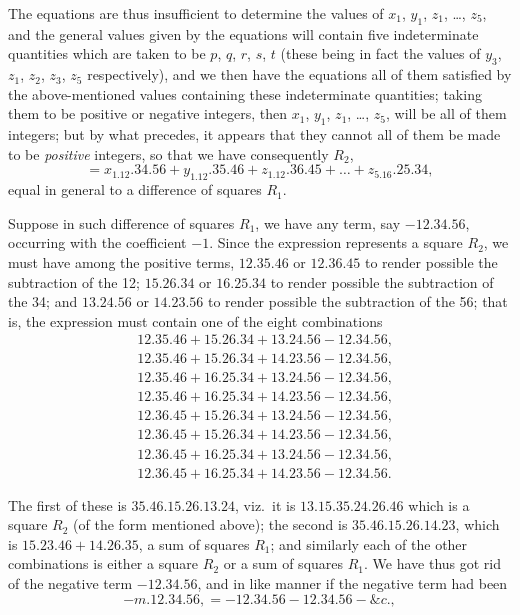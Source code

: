 \documentclass[11pt,a4paper]{book}
\begin{document}
The equations are thus insufficient to determine the values of $x_1$, $y_1$, $z_1$, \ldots, $z_5$, and the general values given by the equations will contain five indeterminate quantities which are taken to be $p$, $q$, $r$, $s$, $t$ (these being in fact the values of $y_3$, $z_1$, $z_2$, $z_3$, $z_5$ respectively), and we then have the equations all of them satisfied by the above-mentioned values containing these indeterminate quantities; taking them to be positive or negative integers, then $x_1$, $y_1$, $z_1$, \ldots, $z_5$, will be all of them integers; but by what precedes, it appears that they cannot all of them be made to be \textit{positive} integers, so that we have consequently $R_2$,
\[
= x_1.12.34.56 + y_1.12.35.46 + z_1.12.36.45 + \ldots + z_5.16.25.34,
\]
equal in general to a difference of squares $R_1$.

Suppose in such difference of squares $R_1$, we have any term, say $-12.34.56$, occurring with the coefficient $-1$. Since the expression represents a square $R_2$, we must have among the positive terms, $12.35.46$ or $12.36.45$ to render possible the subtraction of the 12; $15.26.34$ or $16.25.34$ to render possible the subtraction of the 34; and $13.24.56$ or $14.23.56$ to render possible the subtraction of the 56; that is, the expression must contain one of the eight combinations
\begin{align*}
&12.35.46 + 15.26.34 + 13.24.56 - 12.34.56,\\
&12.35.46 + 15.26.34 + 14.23.56 - 12.34.56,\\
&12.35.46 + 16.25.34 + 13.24.56 - 12.34.56,\\
&12.35.46 + 16.25.34 + 14.23.56 - 12.34.56,\\
&12.36.45 + 15.26.34 + 13.24.56 - 12.34.56,\\
&12.36.45 + 15.26.34 + 14.23.56 - 12.34.56,\\
&12.36.45 + 16.25.34 + 13.24.56 - 12.34.56,\\
&12.36.45 + 16.25.34 + 14.23.56 - 12.34.56.
\end{align*}

The first of these is $35.46.15.26.13.24$, viz.\ it is $13.15.35.24.26.46$ which is a square $R_2$ (of the form mentioned above); the second is $35.46.15.26.14.23$, which is $15.23.46 + 14.26.35$, a sum of squares $R_1$; and similarly each of the other combinations is either a square $R_2$ or a sum of squares $R_1$. We have thus got rid of the negative term $-12.34.56$, and in like manner if the negative term had been
\[
-m.12.34.56, = -12.34.56 - 12.34.56 - \&c.,
\]
\end{document}
